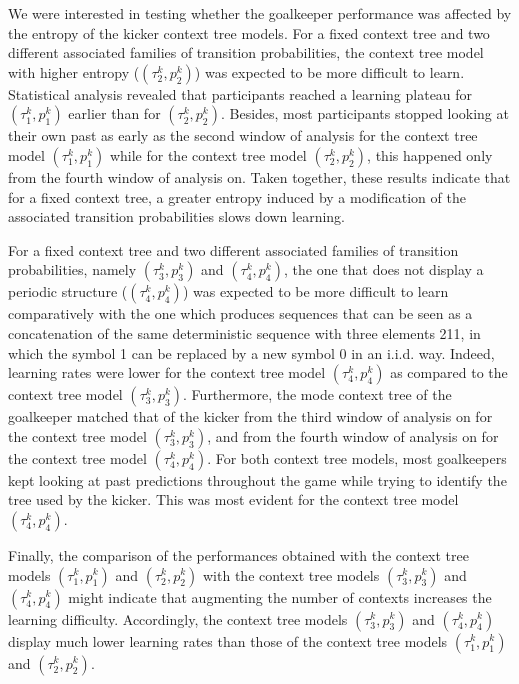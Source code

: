 \documentclass[fleqn,10pt]{wlscirep}
\begin{document}
We were interested in testing whether the goalkeeper performance was affected by the entropy of the kicker context tree models. For a fixed context tree and two different associated families of transition probabilities, the context tree model with higher entropy ($(\tau^k_2, p^k_2)$) was expected to be more difficult to learn. Statistical analysis revealed that participants reached a learning plateau for $(\tau^k_1, p^k_1)$ earlier than for $(\tau^k_2, p^k_2)$. Besides, most participants stopped looking at their own past as early as the second window of analysis for the context tree model $(\tau^k_1, p^k_1)$ while for the context tree model $(\tau^k_2, p^k_2)$, this happened only from the fourth window of analysis on. Taken together, these results indicate that for a fixed context tree, a greater entropy induced by a modification of the associated transition probabilities slows down learning.   

For a fixed context tree and two different associated families of transition probabilities, namely $(\tau^k_3, p^k_3)$ and $(\tau^k_4, p^k_4)$, the one that does not display a periodic structure ($(\tau^k_4, p^k_4)$) was expected to be more difficult to learn comparatively with the one which produces sequences that can be seen as a concatenation of the same deterministic sequence with three elements 211, in which the symbol 1 can be replaced by a new symbol 0 in an i.i.d. way. Indeed, learning rates were lower for the context tree model $(\tau^k_4, p^k_4)$ as compared to the context tree model $(\tau^k_3, p^k_3)$. Furthermore, the mode context tree of the goalkeeper matched that of the kicker from the third window of analysis on for the context tree model $(\tau^k_3, p^k_3)$, and from the fourth window of analysis on for the context tree model $(\tau^k_4, p^k_4)$. For both context tree models, most goalkeepers kept looking at past predictions throughout the game while trying to identify the tree used by the kicker. This was most evident for the context tree model $(\tau^k_4, p^k_4)$.

Finally, the comparison of the performances obtained with the context tree models $(\tau^k_1, p^k_1)$ and $(\tau^k_2, p^k_2)$ with the context tree models $(\tau^k_3, p^k_3)$ and $(\tau^k_4, p^k_4)$ might indicate that augmenting the number of contexts increases the learning difficulty. Accordingly, the context tree models $(\tau^k_3, p^k_3)$ and $(\tau^k_4, p^k_4)$ display much lower learning rates than those of the context tree models $(\tau^k_1, p^k_1)$ and $(\tau^k_2, p^k_2)$. 
\end{document}
